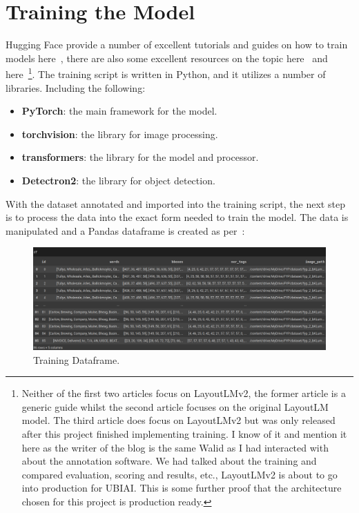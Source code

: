 \section{Training the Model}
Hugging Face provide a number of excellent tutorials and guides on how to train models here~\autocite{FinetunePretrainedModel}, there are also
some excellent resources on the topic here~\autocite{amamouFineTuningTransformerModel2021} and
here~\autocite{amamouFineTuningLayoutLMV22022}\footnote{Neither of the first two articles focus on LayoutLMv2,
	the former article is a generic guide whilst the second article focuses on the original LayoutLM model. The third article
	does focus on LayoutLMv2 but was only released after this project finished implementing training. I know of it and mention it here
	as the writer of the blog is the same Walid as I had interacted with about the annotation software. We had talked about the
	training and compared evaluation, scoring and results, etc., LayoutLMv2 is about to go into production for UBIAI. This is some further
	proof that the architecture chosen for this project is production ready.}.
The training script is written in Python, and it utilizes a number of libraries.
Including the following:
\begin{itemize}
	\item \textbf{PyTorch}: the main framework for the model.
	\item \textbf{torchvision}: the library for image processing.
	\item \textbf{transformers}: the library for the model and processor.
	\item \textbf{Detectron2}: the library for object detection.
\end{itemize}
With the dataset annotated and imported into the training script, the next step is to process the
data into the exact form needed to train the model. The data is manipulated and a Pandas dataframe
is created as per~:
\begin{figure}[H]
	\centering
	\includegraphics[width=1\textwidth]{figures/training_dataframe.png}
	\caption{Training Dataframe.}
	\label{fig:training_dataframe}
\end{figure}

